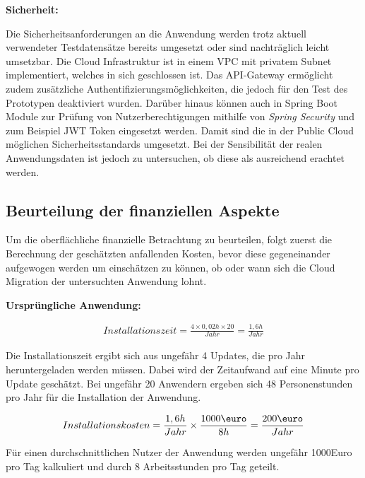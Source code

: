 \textbf{Sicherheit:}

Die Sicherheitsanforderungen an die Anwendung werden trotz aktuell verwendeter Testdatensätze bereits umgesetzt oder sind nachträglich leicht umsetzbar. Die Cloud Infrastruktur ist in einem \ac{VPC} mit privatem Subnet implementiert, welches in sich geschlossen ist. Das API-Gateway ermöglicht zudem zusätzliche Authentifizierungsmöglichkeiten, die jedoch für den Test des Prototypen deaktiviert wurden. Darüber hinaus können auch in \gls{Spring Boot} Module zur Prüfung von Nutzerberechtigungen mithilfe von \textit{Spring Security} und zum Beispiel JWT Token eingesetzt werden. Damit sind die in der Public Cloud möglichen Sicherheitsstandards umgesetzt. Bei der Sensibilität der realen Anwendungsdaten ist jedoch zu untersuchen, ob diese als ausreichend erachtet werden.

\subsection{Beurteilung der finanziellen Aspekte}
Um die oberflächliche finanzielle Betrachtung zu beurteilen, folgt zuerst die Berechnung der geschätzten anfallenden Kosten, bevor diese gegeneinander aufgewogen werden um einschätzen zu können, ob oder wann sich die Cloud Migration der untersuchten Anwendung lohnt.

\textbf{Ursprüngliche Anwendung:}

\begin{align}
    Installationszeit = \frac{4 \times 0,02h \times 20}{Jahr} = \frac{1,6h}{Jahr}
\end{align}

Die Installationszeit ergibt sich aus ungefähr 4 Updates, die pro Jahr heruntergeladen werden müssen. Dabei wird der Zeitaufwand auf eine Minute pro Update geschätzt. Bei ungefähr 20 Anwendern ergeben sich 48 Personenstunden pro Jahr für die Installation der Anwendung.

\begin{align}
    Installationskosten = \frac{1,6h}{Jahr} \times \frac{1000\mbox{\euro}}{8h} =\frac{200\mbox{\euro}}{Jahr}
\end{align}

Für einen durchschnittlichen Nutzer der Anwendung werden ungefähr 1000Euro pro Tag kalkuliert und durch 8 Arbeitsstunden pro Tag geteilt. \pagebreak


